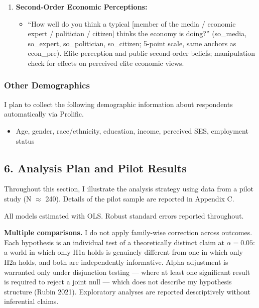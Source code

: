 \documentclass[
  12pt]{article}
\providecommand{\tightlist}{%
  \setlength{\itemsep}{0pt}\setlength{\parskip}{0pt}}
\begin{document}
\begin{enumerate}
  \begin{itemize}
  \tightlist
  \item
    Same item as econ\_pre, post-treatment.
  \end{itemize}
\item
  \textbf{Second-Order Economic Perceptions:}

  \begin{itemize}
  \tightlist
  \item
    ``How well do you think a typical {[}member of the media / economic
    expert / politician / citizen{]} thinks the economy is doing?''
    (so\_media, so\_expert, so\_politician, so\_citizen; 5-point scale,
    same anchors as econ\_pre). Elite-perception and public second-order
    beliefs; manipulation check for effects on perceived elite economic
    views.
  \end{itemize}
\end{enumerate}

\subsubsection{Other Demographics}\label{other-demographics}

I plan to collect the following demographic information about
respondents automatically via Prolific.

\begin{itemize}
\tightlist
\item
  Age, gender, race/ethnicity, education, income, perceived SES,
  employment status
\end{itemize}

\subsection{6. Analysis Plan and Pilot
Results}\label{analysis-plan-and-pilot-results}

Throughout this section, I illustrate the analysis strategy using data
from a pilot study (N \(\approx\) 240). Details of the pilot sample are
reported in Appendix C.

All models estimated with OLS. Robust standard errors reported
throughout.

\textbf{Multiple comparisons.} I do not apply family-wise correction
across outcomes. Each hypothesis is an individual test of a
theoretically distinct claim at \(\alpha = 0.05\): a world in which only
H1a holds is genuinely different from one in which only H2a holds, and
both are independently informative. Alpha adjustment is warranted only
under disjunction testing --- where at least one significant result is
required to reject a joint null --- which does not describe my
hypothesis structure (Rubin 2021). Exploratory analyses are reported
descriptively without inferential claims.
\end{document}
